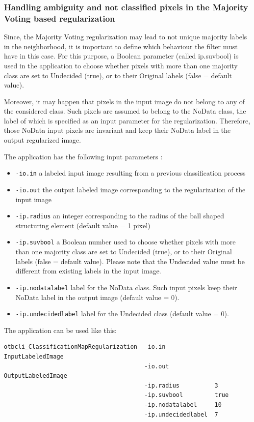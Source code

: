 \subsubsection{Handling ambiguity and not classified pixels in the Majority Voting based regularization}

Since, the Majority Voting regularization may lead to not unique majority labels in the neighborhood, it is important to define
which behaviour the filter must have in this case. For this purpose, a Boolean parameter (called ip.suvbool) is used in the
 application to choose whether pixels with more than one majority class are set to
Undecided (true), or to their Original labels (false = default value).

Moreover, it may happen that pixels in the input image do not belong to any of the considered class. Such pixels are
assumed to belong to the NoData class, the label of which is specified as an input parameter for the regularization. Therefore,
those NoData input pixels are invariant and keep their NoData label in the output regularized image.
 
The  application has the following input parameters :
\begin{itemize}
\item \verb?-io.in? a labeled input image resulting from a previous classification process
\item \verb?-io.out? the output labeled image corresponding to the regularization of the input image
\item \verb?-ip.radius? an integer corresponding to the radius of the ball shaped structuring element (default value = 1 pixel)
\item \verb?-ip.suvbool? a Boolean number used to choose whether pixels with more than one majority class are set to Undecided (true),
or to their Original labels (false = default value). Please note that the Undecided value must be different from existing labels in the input image.
\item \verb?-ip.nodatalabel? label for the NoData class. Such input pixels keep their NoData label in the output image (default value = 0).
\item \verb?-ip.undecidedlabel? label for the Undecided class (default value = 0).
\end{itemize}


The application can be used like this:
\begin{verbatim}
otbcli_ClassificationMapRegularization  -io.in              InputLabeledImage
                                        -io.out             OutputLabeledImage
                                        -ip.radius          3
                                        -ip.suvbool         true
                                        -ip.nodatalabel     10
                                        -ip.undecidedlabel  7
\end{verbatim}
 

